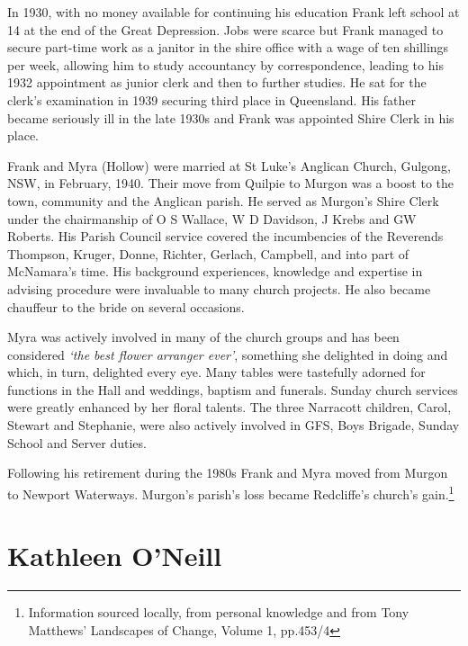 In 1930, with no money available for continuing his education Frank left school at 14 at the end of the Great Depression. Jobs were scarce but Frank managed to secure part-time work as a janitor in the shire office with a wage of ten shillings per week, allowing him to study accountancy by correspondence, leading to his 1932 appointment as junior clerk and then to further studies. He sat for the clerk's examination in 1939 securing third place in Queensland. His father became seriously ill in the late 1930s and Frank was appointed Shire Clerk in his place.



Frank and Myra (Hollow) were married at St Luke's Anglican Church, Gulgong, NSW, in February, 1940. Their move from Quilpie to Murgon was a boost to the town, community and the Anglican parish. He served as Murgon's Shire Clerk under the chairmanship of O S Wallace, W D Davidson, J Krebs and GW Roberts. His Parish Council service covered the incumbencies of the Reverends Thompson, Kruger, Donne, Richter, Gerlach, Campbell, and into part of McNamara's time. His background experiences, knowledge and expertise in advising procedure were invaluable to many church projects. He also became chauffeur to the bride on several occasions.



Myra was actively involved in many of the church groups and has been considered \emph{`the best flower arranger ever'}, something she delighted in doing and which, in turn, delighted every eye. Many tables were tastefully adorned for functions in the Hall and weddings, baptism and funerals. Sunday church services were greatly enhanced by her floral talents. The three Narracott children, Carol, Stewart and Stephanie, were also actively involved in GFS, Boys Brigade, Sunday School and Server duties.



Following his retirement during the 1980s Frank and Myra moved from Murgon to Newport Waterways. Murgon's parish's loss became Redcliffe's church's gain.\footnote{Information sourced locally, from personal knowledge and from Tony Matthews' Landscapes of Change, Volume 1, pp.453/4}


\section{Kathleen O'Neill}



